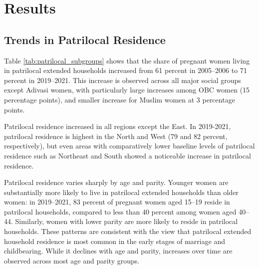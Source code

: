 \documentclass[10pt,twoside,reqno]{article}
\begin{document}
\section{Results}
\subsection{Trends in Patrilocal Residence}

Table \ref{tab:patrilocal_subgroups} shows that the share of pregnant women living in patrilocal extended households increased from 61 percent in 2005–2006 to 71 percent in 2019–2021. This increase is observed across all major social groups except Adivasi women, with particularly large increases among OBC women (15 percentage points), and smaller increase for Muslim women at 3 percentage points.

Patrilocal residence increased in all regions except the East. In 2019-2021, patrilocal residence is highest in the North and West (79 and 82 percent, respectively), but even areas with comparatively lower baseline levels of patrilocal residence such as Northeast and South showed a noticeable increase in patrilocal residence.  

Patrilocal residence varies sharply by age and parity. Younger women are substantially more likely to live in patrilocal extended households than older women: in 2019–2021, 83 percent of pregnant women aged 15–19 reside in patrilocal households, compared to less than 40 percent among women aged 40–44. Similarly, women with lower parity are more likely to reside in patrilocal households. These patterns are consistent with the view that patrilocal extended household residence is most common in the early stages of marriage and childbearing. While it declines with age and parity, increases over time are observed across most age and parity groups. 
\end{document}
